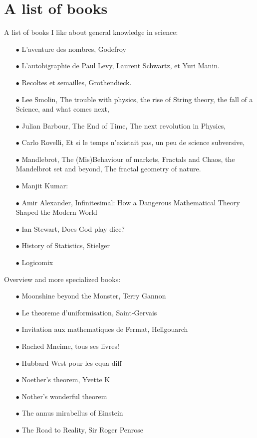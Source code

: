 
\section{A list of books}
  
A list of books I like about general knowledge in science:

\begin{itemize}
\item[$\bullet$] L'aventure des nombres, Godefroy
\item[$\bullet$] L'autobigraphie de Paul Levy, Laurent Schwartz, et Yuri Manin.
\item[$\bullet$] Recoltes et semailles, Grothendieck.
\item[$\bullet$] Lee Smolin, The trouble with physics, the rise of String theory, the fall of a Science, and what comes next,
\item[$\bullet$] Julian Barbour, The End of Time, The next revolution in Physics,
\item[$\bullet$] Carlo Rovelli, Et si le temps n'existait pas, un peu de science subversive,
\item[$\bullet$] Mandlebrot, The (Mis)Behaviour of markets, Fractals and Chaos, the Mandelbrot set and beyond, The fractal geometry of nature.
\item[$\bullet$] Manjit Kumar:
\item[$\bullet$] Amir Alexander, Infinitesimal: How a Dangerous Mathematical Theory Shaped the Modern World
\item[$\bullet$] Ian Stewart, Does God play dice?
\item[$\bullet$] History of Statistics, Stielger
\item[$\bullet$] Logicomix\\
\end{itemize}

Overview and more specialized books:
\begin{itemize}
\item[$\bullet$] Moonshine beyond the Monster, Terry Gannon
\item[$\bullet$] Le theoreme d'uniformisation, Saint-Gervais
\item[$\bullet$] Invitation aux mathematiques de Fermat, Hellgouarch
\item[$\bullet$] Rached Mneime, tous ses livres!
\item[$\bullet$] Hubbard West pour les equa diff
\item[$\bullet$] Noether's theorem, Yvette K
\item[$\bullet$] Nother's wonderful theorem
\item[$\bullet$] The annus mirabellus of Einstein
\item[$\bullet$] The Road to Reality, Sir Roger Penrose 
\end{itemize}

